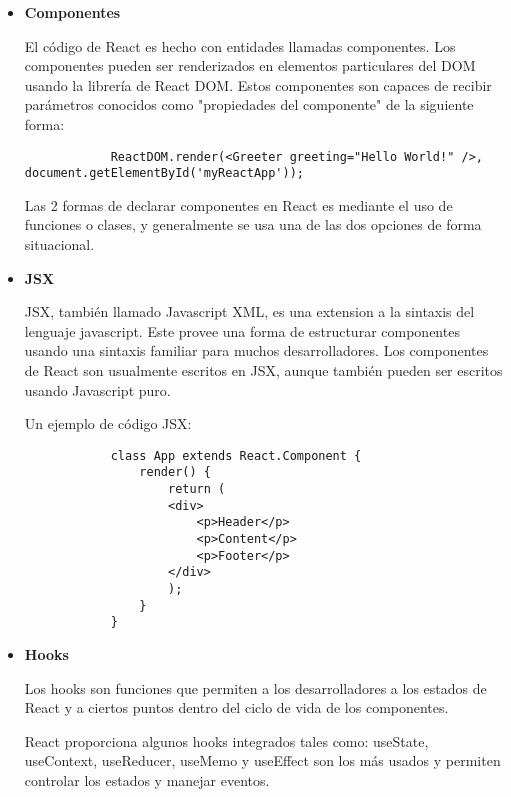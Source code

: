 \begin{itemize}
  \item \textbf{Componentes} \hfill

        El código de React es hecho con entidades llamadas componentes. Los componentes pueden ser renderizados en elementos particulares del DOM usando la librería de React DOM. Estos componentes son capaces de recibir parámetros conocidos como "propiedades del componente" de la siguiente forma: \hfill 

        \begin{lstlisting}
            ReactDOM.render(<Greeter greeting="Hello World!" />, document.getElementById('myReactApp'));
        \end{lstlisting}

        Las 2 formas de declarar componentes en React es mediante el uso de funciones o clases, y generalmente se usa una de las dos opciones de forma situacional.

  \item \textbf{JSX} \hfill

        JSX, también llamado Javascript XML, es una extension a la sintaxis del lenguaje javascript. Este provee una forma de estructurar componentes usando una sintaxis familiar para muchos desarrolladores. Los componentes de React son usualmente escritos en JSX, aunque también pueden ser escritos usando Javascript puro.

        Un ejemplo de código JSX:

        \begin{lstlisting}
            class App extends React.Component {
                render() {
                    return (
                    <div>
                        <p>Header</p>
                        <p>Content</p>
                        <p>Footer</p>
                    </div>
                    );
                }
            }
        \end{lstlisting}

  \item \textbf{Hooks} \hfill 

        Los hooks son funciones que permiten a los desarrolladores  a los estados de React y a ciertos puntos dentro del ciclo de vida de los componentes.

        React proporciona algunos hooks integrados tales como: useState, useContext, useReducer, useMemo y useEffect son los más usados y permiten controlar los estados y manejar eventos.
\end{itemize}

